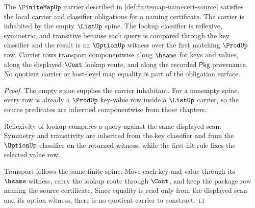 \begin{theorem}
\label{thm:finitemap-carrier-classifier-obligations}
The $\FiniteMapUp$ carrier described in \autoref{def:finitemap-namecert-source} satisfies the local carrier and classifier obligations for a naming certificate. The carrier is inhabited by the empty $\ListUp$ spine. The lookup classifier is reflexive, symmetric, and transitive because each query is compared through the key classifier and the result is an $\OptionUp$ witness over the first matching $\ProdUp$ row. Carrier rows transport componentwise along $\hsame$ for keys and values, along the displayed $\Cont$ lookup route, and along the recorded $\mathsf{Pkg}$ provenance. No quotient carrier or host-level map equality is part of the obligation surface.
\end{theorem}
\begin{proof}
The empty spine supplies the carrier inhabitant. For a nonempty spine, every row is already a $\ProdUp$ key-value row inside a $\ListUp$ carrier, so the source predicates are inherited componentwise from those chapters.

Reflexivity of lookup compares a query against the same displayed scan. Symmetry and transitivity are inherited from the key classifier and from the $\OptionUp$ classifier on the returned witness, while the first-hit rule fixes the selected value row.

Transport follows the same finite spine. Move each key and value through its $\hsame$ witness, carry the lookup route through $\Cont$, and keep the package row naming the source certificate. Since equality is read only from the displayed scan and its option witness, there is no quotient carrier to construct.
\end{proof}

